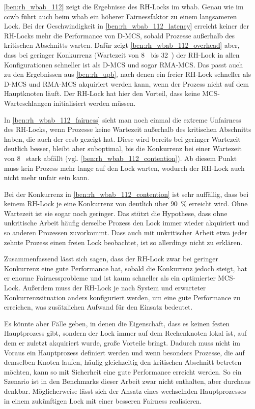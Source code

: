 \autoref{ben:rh_wbab_112} zeigt die Ergebnisse des RH-Locks im \gls{wbab}.
Genau wie im \gls{ccwb} führt auch beim \gls{wbab} ein höherer Fairnessfaktor
zu einem langsameren Lock.
Bei der Geschwindigkeit in \autoref{ben:rh_wbab_112_latency} erreicht keiner der RH-Locks mehr die Performance von D-MCS,
sobald Prozesse außerhalb des kritischen Abschnitts warten.
Dafür zeigt \autoref{ben:rh_wbab_112_overhead} aber,
dass bei geringer \gls{Konkurrenz}
(Wartezeit von 8~ bis 32~)
der RH-Lock in allen Konfigurationen schneller ist
als D-MCS und sogar RMA-MCS.
Das passt auch zu den Ergebnissen aus \autoref{ben:rh_upb},
nach denen ein freier RH-Lock schneller als D-MCS und RMA-MCS akquiriert werden kann,
wenn der Prozess nicht auf dem Hauptknoten läuft.
Der RH-Lock hat hier den Vorteil,
dass keine MCS-Warteschlangen initialisiert werden müssen.

In \autoref{ben:rh_wbab_112_fairness} sieht man noch einmal die extreme Unfairness des RH-Locks,
wenn Prozesse keine Wartezeit außerhalb des kritischen Abschnitts haben,
die auch der \gls{ecsb} gezeigt hat.
Diese wird bereits bei geringer Wartezeit deutlich besser,
bleibt aber suboptimal,
bis die \gls{Konkurrenz} bei einer Wartezeit von 8~ stark abfällt
(vgl. \autoref{ben:rh_wbab_112_contention}).
Ab diesem Punkt muss kein Prozess mehr lange auf den Lock warten,
wodurch der RH-Lock auch nicht mehr unfair sein kann.

Bei der \gls{Konkurrenz} in \autoref{ben:rh_wbab_112_contention} ist sehr auffällig,
dass bei keinem RH-Lock je eine \gls{Konkurrenz} von deutlich über 90~\% erreicht wird.
Ohne Wartezeit ist sie sogar noch geringer.
Das stützt die Hypothese,
dass ohne unkritische Arbeit häufig derselbe Prozess den Lock immer wieder akquiriert und so anderen Prozessen zuvorkommt.
Dass auch mit unkritischer Arbeit etwa jeder zehnte Prozess einen freien Lock beobachtet,
ist so allerdings nicht zu erklären.

Zusammenfassend lässt sich sagen,
dass der RH-Lock zwar bei geringer \gls{Konkurrenz} eine gute Performance hat,
sobald die \gls{Konkurrenz} jedoch steigt,
hat er enorme Fairnessprobleme
und ist kaum schneller als ein optimierter MCS-Lock.
Außerdem muss der RH-Lock je nach System
und erwarteter Konkurrenzsituation anders konfiguriert werden,
um eine gute Performance zu erreichen,
was zusätzlichen Aufwand für den Einsatz bedeutet.

Es könnte aber Fälle geben,
in denen die Eigenschaft,
dass es keinen festen Hauptprozess gibt,
sondern der Lock immer auf dem Rechenknoten lokal ist,
auf dem er zuletzt akquiriert wurde,
große Vorteile bringt.
Dadurch muss nicht im Voraus ein Hauptprozess definiert werden
und wenn besonders Prozesse,
die auf demselben Knoten laufen,
häufig gleichzeitig den kritischen Abschnitt betreten möchten,
kann so mit Sicherheit eine gute Performance erreicht werden.
So ein Szenario ist in den Benchmarks dieser Arbeit zwar nicht enthalten,
aber durchaus denkbar.
Möglicherweise lässt sich der Ansatz eines wechselnden Hauptprozesses in einem zukünftigen Lock
mit einer besseren Fairness realisieren.

